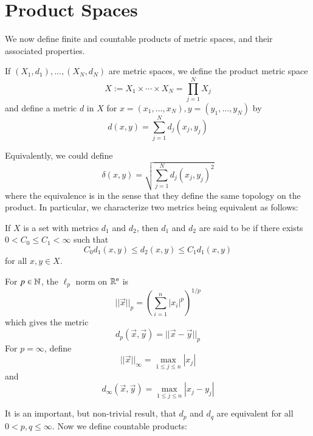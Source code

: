 \section{Product Spaces}


We now define finite and countable products of metric spaces, and their associated properties.

\begin{defn}
    If $(X_1,d_1),...,(X_N,d_N)$ are metric spaces, we define the product metric space \begin{equation*}
        X := X_1\times \cdots \times X_N = \prod_{j=1}^NX_j
    \end{equation*}
    and define a metric $d$ in $X$ for $x = (x_1,...,x_N),y = (y_1,...,y_N)$ by \begin{equation*}
        d(x,y) = \sum_{j=1}^Nd_j(x_j,y_j)
    \end{equation*}
\end{defn}
Equivalently, we could define \begin{equation*}
    \delta(x,y) = \sqrt{\sum_{j=1}^Nd_j(x_j,y_j)^2}
\end{equation*}
where the equivalence is in the sense that they define the same topology on the product. In particular, we characterize two metrics being equivalent as follows:

\begin{defn}
    If $X$ is a set with metrics $d_1$ and $d_2$, then $d_1$ and $d_2$ are said to be  if there exists $0 < C_0 \leq C_1 < \infty$ such that \begin{equation*}
        C_0d_1(x,y) \leq d_2(x,y) \leq C_1d_1(x,y)
    \end{equation*}
    for all $x,y \in X$.
\end{defn}

\begin{defn}
    For $p \in \mathbb N$, the $\ell_p$ norm on $\mathbb R^n$ is \begin{equation*}
        ||\vec{x}||_p = \left(\sum_{i=1}^n|x_i|^p\right)^{1/p}
    \end{equation*}
    which gives the metric $$d_p(\vec{x},\vec{y}) = ||\vec{x} - \vec{y}||_p$$ For $p = \infty$, define $$||\vec{x}||_{\infty} = \max_{1\leq j \leq n}|x_j|$$ and $$d_{\infty}(\vec{x},\vec{y}) = \max_{1\leq j \leq n}|x_j - y_j|$$
\end{defn}

It is an important, but non-trivial result, that $d_p$ and $d_q$ are equivalent for all $0 < p,q \leq \infty$. Now we define countable products:


